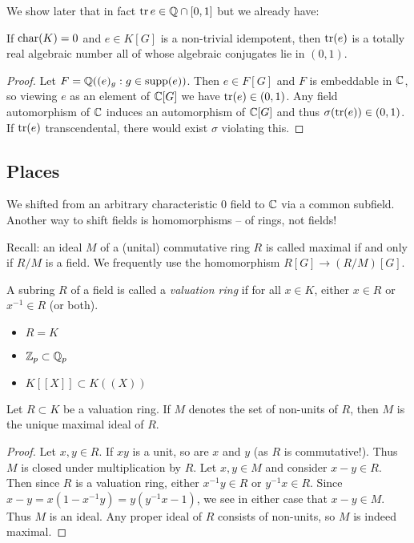We show later that in fact $\operatorname{tr} e \in \mathbb{Q} \cap [0, 1]$ but we already have:
\begin{corollary}
    If $\mathrm{char}(K) = 0$ and $e \in K[G]$ is a non-trivial idempotent, then $\operatorname{tr}(e)$ is a totally real algebraic number all of whose algebraic conjugates lie in $(0, 1)$.
\end{corollary}

\begin{proof}
    Let $F = \mathbb{Q}((e)_g : g \in \operatorname{supp}(e))$.
    Then $e \in F[G]$ and $F$ is embeddable in $\mathbb{C}$, so viewing $e$ as an element of $\mathbb{C}[G]$ we have $\operatorname{tr}(e) \in (0, 1)$.
    Any field automorphism of $\mathbb{C}$ induces an automorphism of $\mathbb{C}[G]$ and thus $\sigma(\operatorname{tr}(e)) \in (0, 1)$.
    If $\operatorname{tr}(e)$ transcendental, there would exist $\sigma$ violating this.
\end{proof}

\subsection*{Places}

We shifted from an arbitrary characteristic $0$ field to $\mathbb{C}$ via a common subfield.
Another way to shift fields is homomorphisms -- of rings, not fields!

Recall: an ideal $M$ of a (unital) commutative ring $R$ is called maximal if and only if $R / M$ is a field.
We frequently use the homomorphism $R[G] \to (R / M)[G]$.

\begin{definition}
    A subring $R$ of a field is called a \emph{valuation ring} if for all $x \in K$, either $x \in R$ or $x^{-1} \in R$ (or both).
\end{definition}

\begin{example}
    \begin{itemize}
        \item $R = K$
        \item $\mathbb{Z}_p \subset \mathbb{Q}_p$
        \item $K[[X]] \subset K((X))$
    \end{itemize}
\end{example}

\begin{lemma}
    Let $R \subset K$ be a valuation ring.
    If $M$ denotes the set of non-units of $R$, then $M$ is the unique maximal ideal of $R$.
\end{lemma}

\begin{proof}
    Let $x, y \in R$.
    If $xy$ is a unit, so are $x$ and $y$ (as $R$ is commutative!).
    Thus $M$ is closed under multiplication by $R$.
    Let $x, y \in M$ and consider $x - y \in R$.
    Then since $R$ is a valuation ring, either $x^{-1} y \in R$ or $y^{-1} x \in R$.
    Since $x - y = x(1 - x^{-1}y) = y(y^{-1} x - 1)$, we see in either case that $x - y \in M$.
    Thus $M$ is an ideal.
    Any proper ideal of $R$ consists of non-units, so $M$ is indeed maximal.
\end{proof}

